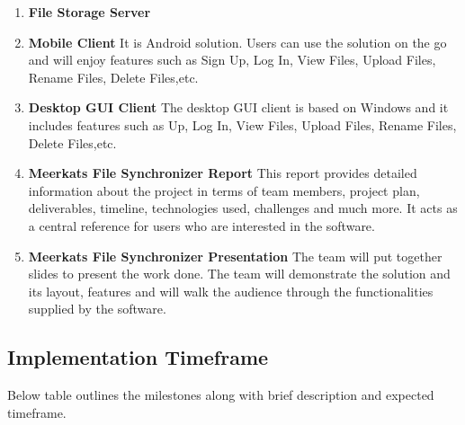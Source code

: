 \documentclass{article}
\begin{document}
\begin{enumerate}

  \item \textbf{File Storage Server}
  \item \textbf{Mobile Client} It is Android solution. Users can use the solution on the go and will enjoy features such as Sign Up, Log In,  View Files, Upload Files, Rename Files, Delete Files,etc.
  \item \textbf{Desktop GUI Client} The desktop GUI client is based on Windows and it includes features such as  Up, Log In,  View Files, Upload Files, Rename Files, Delete Files,etc.
  \item \textbf{Meerkats File Synchronizer Report} This report provides detailed information about the project in terms of team members, project plan, deliverables, timeline, technologies used, challenges and much more. It acts as a central reference for users who are interested in the software.
  \item \textbf{Meerkats File Synchronizer Presentation} The team will put together slides to present the work done. The team will demonstrate the solution and its layout, features and will walk the audience through the functionalities supplied by the software.

\end{enumerate}

\subsection{Implementation Timeframe}
Below table outlines the milestones along with brief description and expected timeframe.
\end{document}
